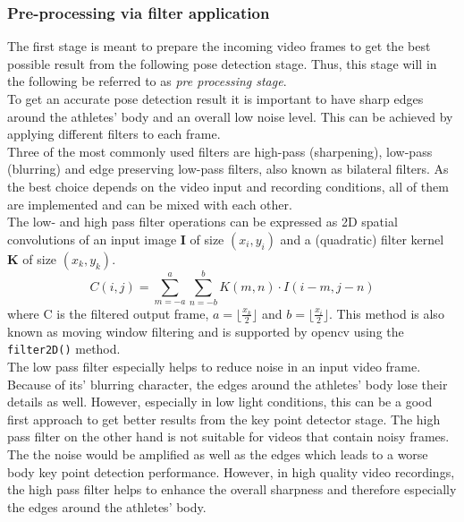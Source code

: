 \subsubsection*{Pre-processing via filter application}
The first stage is meant to prepare the incoming video frames to get the best
possible result from the following pose detection stage.
Thus, this stage will in the following be referred to as \textit{pre
processing stage}.\\
To get an accurate pose detection result it is important to have sharp edges
around the athletes' body and an overall low noise level.
This can be achieved by applying different filters to each frame.\\
Three of the most commonly used filters are high-pass (sharpening), low-pass
(blurring) and edge preserving low-pass filters, also known as bilateral
filters.
As the best choice depends on the video input and recording conditions,
all of them are implemented and can be mixed with each other.\\
The low- and high pass filter operations can be expressed as 2D spatial
convolutions of an input image \textbf{I} of size $(x_i,y_i)$ and a (quadratic)
filter kernel \textbf{K} of size $(x_k, y_k)$.
\begin{equation}
    C(i, j) = \sum_{m=-a}^{a} \sum_{n=-b}^{b} K(m, n) \cdot I(i - m, j - n)
\end{equation}   
where C is the filtered output frame, $a = \lfloor \frac{x_k}{2} \rfloor$ and
$b = \lfloor \frac{x_i}{2} \rfloor$.
This method is also known as moving window filtering and is supported by
opencv using the \texttt{filter2D()} method.\\
The low pass filter especially helps to reduce noise in an input video frame.
Because of its' blurring character, the edges around the athletes' body lose
their details as well.
However, especially in low light conditions, this can be a good first approach
to get better results from the key point detector stage.
The high pass filter on the other hand is not suitable for videos that contain
noisy frames.
The the noise would be amplified as well as the edges which leads to
a worse body key point detection performance.
However, in high quality video recordings, the high pass filter helps to
enhance the overall sharpness and therefore especially the edges around the
athletes' body.\\

